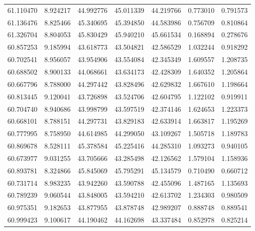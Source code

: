 \begin{tabular}{rrrrrrr}
 61.110470 &   8.924217 &         44.992776 &         45.011339 &         44.219766 &  0.773010 &  0.791573 \\
 61.136476 &   8.825466 &         45.340695 &         45.394850 &         44.583986 &  0.756709 &  0.810864 \\
 61.326704 &   8.804053 &         45.830429 &         45.940210 &         45.661534 &  0.168894 &  0.278676 \\
 60.857253 &   9.185994 &         43.618773 &         43.504821 &         42.586529 &  1.032244 &  0.918292 \\
 60.702541 &   8.956057 &         43.954906 &         43.554084 &         42.345349 &  1.609557 &  1.208735 \\
 60.688502 &   8.900133 &         44.068661 &         43.634173 &         42.428309 &  1.640352 &  1.205864 \\
 60.667796 &   8.788000 &         44.297442 &         43.828496 &         42.629832 &  1.667610 &  1.198664 \\
 60.813445 &   9.120041 &         43.726898 &         43.524706 &         42.604795 &  1.122102 &  0.919911 \\
 60.704740 &   8.940686 &         43.998799 &         43.597519 &         42.374146 &  1.624653 &  1.223373 \\
 60.668101 &   8.788151 &         44.297731 &         43.829183 &         42.633914 &  1.663817 &  1.195269 \\
 60.777995 &   8.758950 &         44.614985 &         44.299050 &         43.109267 &  1.505718 &  1.189783 \\
 60.869678 &   8.528111 &         45.378584 &         45.225416 &         44.285310 &  1.093273 &  0.940105 \\
 60.673977 &   9.031255 &         43.705666 &         43.285498 &         42.126562 &  1.579104 &  1.158936 \\
 60.893781 &   8.324866 &         45.845069 &         45.795291 &         45.134579 &  0.710490 &  0.660712 \\
 60.731714 &   8.983235 &         43.942260 &         43.590788 &         42.455096 &  1.487165 &  1.135693 \\
 60.789239 &   9.060544 &         43.848005 &         43.594210 &         42.613702 &  1.234303 &  0.980509 \\
 60.975351 &   9.182653 &         43.877955 &         43.878748 &         42.989207 &  0.888748 &  0.889541 \\
 60.999423 &   9.100617 &         44.190462 &         44.162698 &         43.337484 &  0.852978 &  0.825214 \\

\end{tabular}
